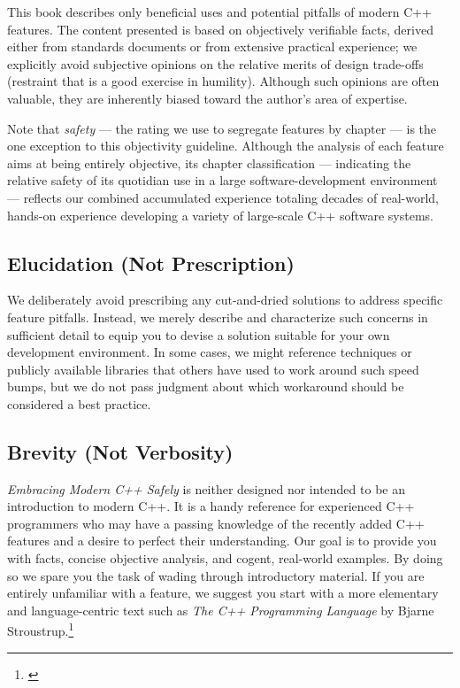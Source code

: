 This book describes only beneficial uses and potential pitfalls of modern C++ features. The content presented is based on objectively verifiable facts, derived either from standards documents or from extensive practical experience; we explicitly avoid subjective opinions on the relative merits of design trade-offs (restraint that is a good exercise in humility). Although such opinions are often valuable, they are inherently biased toward the author's area of expertise.

Note that \emph{safety} --- the rating we use to segregate features by chapter --- is the one exception to this objectivity guideline. Although the analysis of each feature aims at being entirely objective, its chapter classification --- indicating the relative safety of its quotidian use in a large software-development environment --- reflects our combined accumulated experience totaling decades of real-world, hands-on experience developing a variety of large-scale C++ software systems.

\subsection{Elucidation (Not Prescription)}

We deliberately avoid prescribing any cut-and-dried solutions to address specific feature pitfalls. Instead, we merely describe and characterize such concerns in sufficient detail to equip you to devise a solution suitable for your own development environment. In some cases, we might reference techniques or publicly available libraries that others have used to work around such speed bumps, but we do not pass judgment about which workaround should be considered a best practice.

\subsection{Brevity (Not Verbosity)}

\textit{Embracing Modern C++ Safely} is neither designed nor intended to be an introduction to modern C++. It is a handy reference for experienced C++ programmers who may have a passing knowledge of the recently added C++ features and a desire to perfect their understanding. Our goal is to provide you with facts, concise objective analysis, and cogent, real-world examples. By doing so we spare you the task of wading through introductory material. If you are entirely unfamiliar with a feature, we suggest you start with a more elementary and language-centric text such as \textit{The C++ Programming Language} by Bjarne Stroustrup.\footnote{\cite{stroustrup13}}


